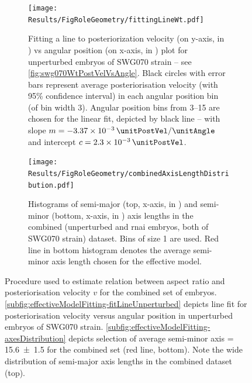 \begin{figure}
\centering
\begin{subfigure}[t]{0.45\textwidth}
    \centering
    \texttt{[image: Results/FigRoleGeometry/fittingLineWt.pdf]}
    \caption{Fitting a line to posteriorization velocity (on y-axis, in \si{\unitPostVel}) vs angular position (on x-axis, in \si{\unitAngle}) plot for unperturbed embryos of SWG070 strain -- see \autoref{fig:swg070WtPostVelVsAngle}. Black circles with error bars represent average posteriorisation velocity (with \num{95}\% confidence interval) in each angular position bin (of bin width \SI{3}{\unitAngle}). Angular position bins from \SIrange{3}{15}{\unitAngle} are chosen for the linear fit, depicted by black line -- with slope $m = \SI{-3.37e-3}{\unitPostVel\per\unitAngle}$ and intercept $c = \SI{2.3e-3}{\unitPostVel}$.} 
    \label{subfig:effectiveModelFitting-fitLineUnperturbed}
\end{subfigure}
\hfill
\begin{subfigure}[t]{0.45\textwidth}
    \centering
    \texttt{[image: Results/FigRoleGeometry/combinedAxisLengthDistribution.pdf]}
    \caption{Histograms of semi-major \longAxisLength (top, x-axis, in \si{\unitLength}) and semi-minor \shortAxisLength (bottom, x-axis, in \si{\unitLength}) axis lengths in the combined (unperturbed and  \ac{rnai} embryos, both of SWG070 strain) dataset. Bins of size \SI{1}{\unitLength} are used. Red line in bottom histogram denotes the average semi-minor axis length chosen for the effective model.} 
    \label{subfig:effectiveModelFitting-axesDistribution}
\end{subfigure}
\caption[Estimating relation between aspect ratio and posteriorization velocity in effective model]{Procedure used to estimate relation between aspect ratio \aspectRatio and posteriorisation velocity $v$ for the combined set of embryos. \autoref{subfig:effectiveModelFitting-fitLineUnperturbed} depicts line fit for posteriorisation velocity versus angular position in unperturbed embryos of SWG070 strain. \autoref{subfig:effectiveModelFitting-axesDistribution} depicts selection of average semi-minor axis \shortAxisLength = \SI{15.6 +- 1.5}{\unitLength} for the combined set (red line, bottom). Note the wide distribution of semi-major axis lengths \longAxisLength in the combined dataset (top).}
\label{fig:effectiveModelFitting}
\end{figure}

